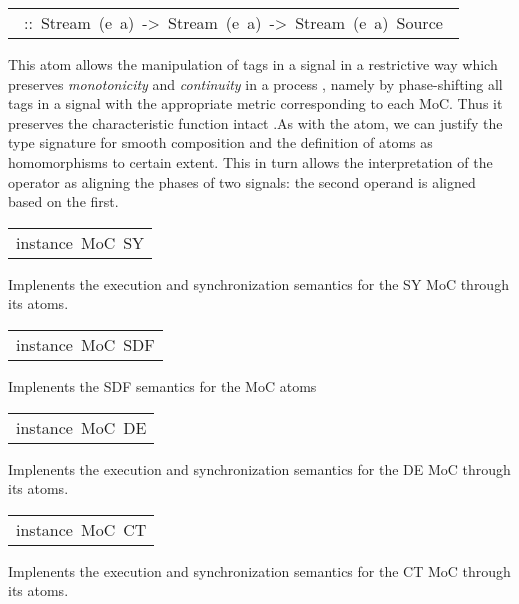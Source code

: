 \begin{haddockdesc}
\begin{haddockdesc}
\item[\begin{tabular}{@{}l}\haddockid{(-\&-)}\ ::\ Stream\ (e\ a)\ ->\ Stream\ (e\ a)\ ->\ Stream\ (e\ a)\ Source\ \end{tabular}]
\haddockbegindoc
This atom allows the manipulation of tags in a signal in a restrictive way which preserves \emph{monotonicity} and \emph{continuity} in a process  \cite{Lee98}, namely by phase-shifting all tags in a signal with the appropriate metric corresponding to each MoC. Thus it preserves the characteristic function intact  \cite{Sander04}.As with the \haddockid{-<-} atom, we can justify the type signature for smooth composition and the definition of atoms as homomorphisms to certain extent. This in turn allows the interpretation of the  operator as aligning the phases of two signals: the second operand is aligned based on the first.\par

\end{haddockdesc}


\item[\begin{tabular}{@{}l}
instance\ MoC\ SY
\end{tabular}]\haddockbegindoc
Implenents the execution and synchronization semantics for the SY
 MoC through its atoms.\par


\item[\begin{tabular}{@{}l}
instance\ MoC\ SDF
\end{tabular}]\haddockbegindoc
Implenents the SDF semantics for the MoC atoms\par


\item[\begin{tabular}{@{}l}
instance\ MoC\ DE
\end{tabular}]\haddockbegindoc
Implenents the execution and synchronization semantics for the DE
 MoC through its atoms.\par


\item[\begin{tabular}{@{}l}
instance\ MoC\ CT
\end{tabular}]\haddockbegindoc
Implenents the execution and synchronization semantics for the CT
 MoC through its atoms.\par

\end{haddockdesc}
